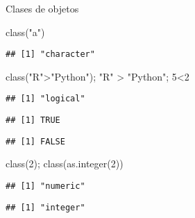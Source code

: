 \documentclass[
  10,
  ignorenonframetext,
]{beamer}
\newenvironment{Shaded}{\begin{snugshade}}{\end{snugshade}}
\newcommand{\DecValTok}[1]{\textcolor[rgb]{0.00,0.00,0.81}{#1}}
\newcommand{\FunctionTok}[1]{\textcolor[rgb]{0.00,0.00,0.00}{#1}}
\newcommand{\NormalTok}[1]{#1}
\newcommand{\SpecialCharTok}[1]{\textcolor[rgb]{0.00,0.00,0.00}{#1}}
\newcommand{\StringTok}[1]{\textcolor[rgb]{0.31,0.60,0.02}{#1}}
\begin{document}
\begin{frame}[fragile]{Clases de objetos}
\protect\hypertarget{clases-de-objetos}{}
\begin{Shaded}
\begin{Highlighting}[]
\FunctionTok{class}\NormalTok{(}\StringTok{"a"}\NormalTok{)}
\end{Highlighting}
\end{Shaded}

\begin{verbatim}
## [1] "character"
\end{verbatim}

\begin{Shaded}
\begin{Highlighting}[]
\FunctionTok{class}\NormalTok{(}\StringTok{"R"}\SpecialCharTok{\textgreater{}}\StringTok{"Python"}\NormalTok{); }\StringTok{"R"} \SpecialCharTok{\textgreater{}} \StringTok{"Python"}\NormalTok{; }\DecValTok{5}\SpecialCharTok{\textless{}}\DecValTok{2}
\end{Highlighting}
\end{Shaded}

\begin{verbatim}
## [1] "logical"
\end{verbatim}

\begin{verbatim}
## [1] TRUE
\end{verbatim}

\begin{verbatim}
## [1] FALSE
\end{verbatim}

\begin{Shaded}
\begin{Highlighting}[]
\FunctionTok{class}\NormalTok{(}\DecValTok{2}\NormalTok{); }\FunctionTok{class}\NormalTok{(}\FunctionTok{as.integer}\NormalTok{(}\DecValTok{2}\NormalTok{))}
\end{Highlighting}
\end{Shaded}

\begin{verbatim}
## [1] "numeric"
\end{verbatim}

\begin{verbatim}
## [1] "integer"
\end{verbatim}
\end{frame}
\end{document}

